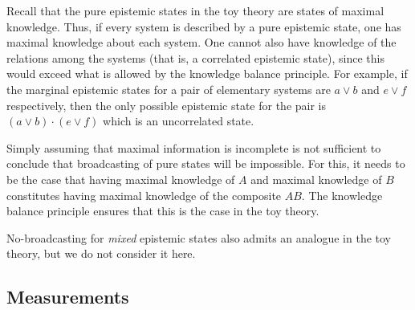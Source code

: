 \documentclass[pra,twocolumn,nofootinbib,showpacs]{revtex4}
\begin{document}
Recall that the pure epistemic states in the toy theory are states of
maximal knowledge. Thus, if every system is described by a pure epistemic
state, one has maximal knowledge about each system. One cannot also have
knowledge of the relations among the systems (that is, a correlated
epistemic state), since this would exceed what is allowed by the knowledge
balance principle. For example, if the marginal epistemic states for a pair
of elementary systems are $a\vee b$ and $e\vee f$ respectively, then the
only possible epistemic state for the pair is $(a\vee b)\cdot (e\vee f)$
which is an uncorrelated state.

Simply assuming that maximal information is incomplete is not sufficient to
conclude that broadcasting of pure states will be impossible. For this, it
needs to be the case that having maximal knowledge of $A$ and maximal
knowledge of $B$ constitutes having maximal knowledge of the composite $AB.$
The knowledge balance principle ensures that this is the case in the toy
theory.

No-broadcasting for \emph{mixed} epistemic states also admits an analogue in
the toy theory, but we do not consider it here.

\subsection{Measurements}

\label{measurements2}
\end{document}
